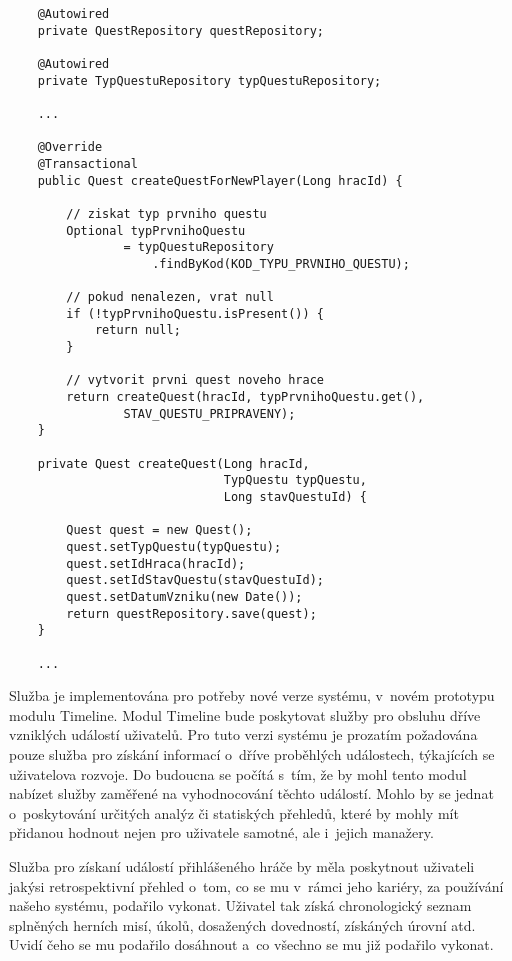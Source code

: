 \documentclass[12pt]{article}
\begin{document}
{\begin{lstlisting}
    @Autowired
    private QuestRepository questRepository;
    
    @Autowired
    private TypQuestuRepository typQuestuRepository;
    
    ...
    
    @Override
    @Transactional
    public Quest createQuestForNewPlayer(Long hracId) {

        // ziskat typ prvniho questu
        Optional typPrvnihoQuestu
                = typQuestuRepository
                    .findByKod(KOD_TYPU_PRVNIHO_QUESTU);

        // pokud nenalezen, vrat null
        if (!typPrvnihoQuestu.isPresent()) {
            return null;
        }

        // vytvorit prvni quest noveho hrace
        return createQuest(hracId, typPrvnihoQuestu.get(),
                STAV_QUESTU_PRIPRAVENY);
    }
    
    private Quest createQuest(Long hracId,
                              TypQuestu typQuestu,
                              Long stavQuestuId) {

        Quest quest = new Quest();
        quest.setTypQuestu(typQuestu);
        quest.setIdHraca(hracId);
        quest.setIdStavQuestu(stavQuestuId);
        quest.setDatumVzniku(new Date());
        return questRepository.save(quest);
    }
    
    ...

\end{lstlisting}

\clearpage


Služba je implementována pro potřeby nové verze systému, v~novém prototypu modulu Timeline. 
Modul Timeline bude poskytovat služby pro obsluhu dříve vzniklých událostí uživatelů.
Pro tuto verzi systému je prozatím požadována pouze služba pro získání informací o~dříve
proběhlých událostech, týkajících se uživatelova rozvoje.
Do budoucna se počítá s~tím, že by mohl tento modul nabízet služby zaměřené na vyhodnocování těchto událostí.
Mohlo by se jednat o~poskytování určitých analýz či statiských přehledů,
které by mohly mít přidanou hodnout nejen pro uživatele samotné, ale i~jejich manažery.

Služba pro získaní událostí přihlášeného hráče by měla poskytnout
uživateli jakýsi retrospektivní přehled o~tom,
co se mu v~rámci jeho kariéry, za používání našeho systému, podařilo vykonat.
Uživatel tak získá chronologický seznam splněných herních misí, úkolů,
dosažených dovedností, získáných úrovní atd.
Uvidí čeho se mu podařilo dosáhnout a~co všechno se mu již podařilo vykonat.


}
\end{document}

